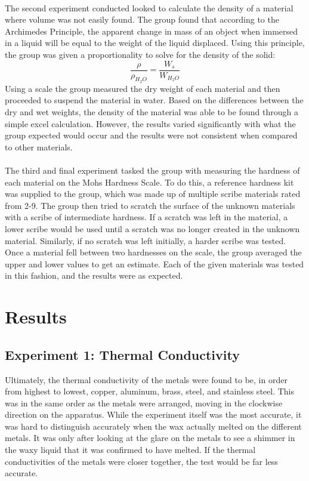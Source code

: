 \documentclass{article}
\begin{document}
\paragraph{}
The second experiment conducted looked to calculate the density of a material where volume was not easily found. The group found that according to the Archimedes Principle, the apparent change in mass of an object when immersed in a liquid will be equal to the weight of the liquid displaced. Using this principle, the group was given a proportionality to solve for the density of the solid:
$$\frac{\rho}{\rho_{H_2O}} = \frac{W_s}{W_{H_2O}}$$
Using a scale the group measured the dry weight of each material and then proceeded to suspend the material in water. Based on the differences between the dry and wet weights, the density of the material was able to be found through a simple excel calculation. However, the results varied significantly with what the group expected would occur and the results were not consistent when compared to other materials.
\paragraph{}
The third and final experiment tasked the group with measuring the hardness of each material on the Mohs Hardness Scale. To do this, a reference hardness kit was supplied to the group, which was made up of multiple scribe materials rated from 2-9. The group then tried to scratch the surface of the unknown materials with a scribe of intermediate hardness. If a scratch was left in the material, a lower scribe would be used until a scratch was no longer created in the unknown material. Similarly, if no scratch was left initially, a harder scribe was tested. Once a material fell between two hardnesses on the scale, the group averaged the upper and lower values to get an estimate. Each of the given materials was tested in this fashion, and the results were as expected.

\section{Results}
\subsection{Experiment 1: Thermal Conductivity}
Ultimately, the thermal conductivity of the metals were found to be, in order from highest to lowest, copper, aluminum, brass, steel, and stainless steel. This was in the same order as the metals were arranged, moving in the clockwise direction on the apparatus. While the experiment itself was the most accurate, it was hard to distinguish accurately when the wax actually melted on the different metals. It was only after looking at the glare on the metals to see a shimmer in the waxy liquid that it was confirmed to have melted. If the thermal conductivities of the metals were closer together, the test would be far less accurate.
\end{document}
